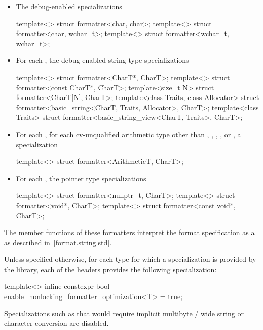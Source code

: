 \begin{itemize}
\item
{}%
The debug-enabled specializations
\begin{codeblock}
template<> struct formatter<char, char>;
template<> struct formatter<char, wchar_t>;
template<> struct formatter<wchar_t, wchar_t>;
\end{codeblock}

\item
{}%
For each ,
the debug-enabled string type specializations
\begin{codeblock}
template<> struct formatter<CharT*, CharT>;
template<> struct formatter<const CharT*, CharT>;
template<size_t N> struct formatter<CharT[N], CharT>;
template<class Traits, class Allocator>
  struct formatter<basic_string<CharT, Traits, Allocator>, CharT>;
template<class Traits>
  struct formatter<basic_string_view<CharT, Traits>, CharT>;
\end{codeblock}

\item
{}%
For each ,
for each cv-unqualified arithmetic type 
other than
,
,
,
, or
,
a specialization
\begin{codeblock}
template<> struct formatter<ArithmeticT, CharT>;
\end{codeblock}

\item
{}%
%
For each ,
the pointer type specializations
\begin{codeblock}
template<> struct formatter<nullptr_t, CharT>;
template<> struct formatter<void*, CharT>;
template<> struct formatter<const void*, CharT>;
\end{codeblock}
\end{itemize}
The  member functions of these formatters
interpret the format specification
as a 
as described in~\ref{format.string.std}.

\pnum
Unless specified otherwise, for each type  for which
a  specialization is provided by the library,
each of the headers provides the following specialization:
\begin{codeblock}
template<> inline constexpr bool enable_nonlocking_formatter_optimization<T> = true;
\end{codeblock}
\begin{note}
Specializations such as 
that would require implicit
multibyte / wide string or character conversion are disabled.
\end{note}

